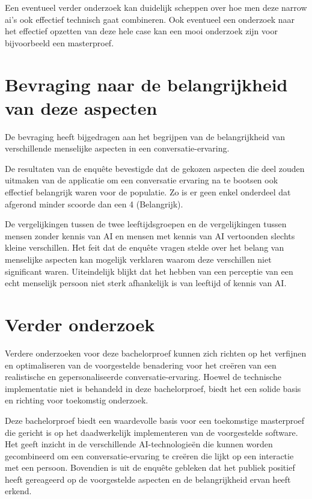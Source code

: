 Een eventueel verder onderzoek kan duidelijk scheppen over hoe men deze narrow ai's ook effectief technisch gaat combineren. Ook eventueel een onderzoek naar het effectief opzetten van deze hele case kan een mooi onderzoek zijn voor bijvoorbeeld een masterproef.

\section{Bevraging naar de belangrijkheid van deze aspecten}

De bevraging heeft bijgedragen aan het begrijpen van de belangrijkheid van verschillende menselijke aspecten in een conversatie-ervaring. 

De resultaten van de enquête bevestigde dat de gekozen aspecten die deel zouden uitmaken van de applicatie om een conversatie ervaring na te bootsen ook effectief belangrijk waren voor de populatie. Zo is er geen enkel onderdeel dat afgerond minder scoorde dan een 4 (Belangrijk).

De vergelijkingen tussen de twee leeftijdsgroepen en de vergelijkingen tussen mensen zonder kennis van AI en mensen met kennis van AI vertoonden slechts kleine verschillen. Het feit dat de enquête vragen stelde over het belang van menselijke aspecten kan mogelijk verklaren waarom deze verschillen niet significant waren. Uiteindelijk blijkt dat het hebben van een perceptie van een echt menselijk persoon niet sterk afhankelijk is van leeftijd of kennis van AI.

\section{Verder onderzoek}

Verdere onderzoeken voor deze bachelorproef kunnen zich richten op het verfijnen en optimaliseren van de voorgestelde benadering voor het creëren van een realistische en gepersonaliseerde conversatie-ervaring. Hoewel de technische implementatie niet is behandeld in deze bachelorproef, biedt het een solide basis en richting voor toekomstig onderzoek.

Deze bachelorproef biedt een waardevolle basis voor een toekomstige masterproef die gericht is op het daadwerkelijk implementeren van de voorgestelde software. Het geeft inzicht in de verschillende AI-technologieën die kunnen worden gecombineerd om een conversatie-ervaring te creëren die lijkt op een interactie met een persoon. Bovendien is uit de enquête gebleken dat het publiek positief heeft gereageerd op de voorgestelde aspecten en de belangrijkheid ervan heeft erkend.



